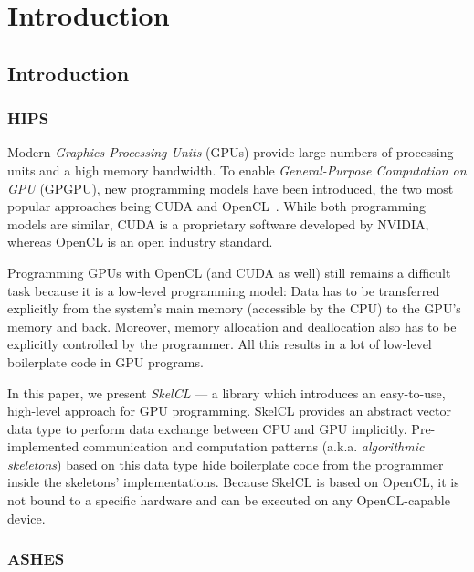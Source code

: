 
\chapter{Introduction} %

\label{ch:introduction} %

\section{Introduction}

\subsection{HIPS}
Modern \emph{Graphics Processing Units} (GPUs) provide large numbers of processing units and a high memory bandwidth.
To enable \emph{General-Purpose Computation on GPU} (GPGPU), new programming models have been introduced, the two most popular approaches being CUDA and OpenCL~\cite{KiHw-10,OpenCL-10}.
While both programming models are similar, CUDA is a proprietary software developed by NVIDIA, whereas OpenCL is an open industry standard.

Programming GPUs with OpenCL (and CUDA as well) still remains a difficult task because it is a low-level programming model:
Data has to be transferred explicitly from the system's main memory (accessible by the CPU) to the GPU's memory and back.
Moreover, memory allocation and deallocation also has to be explicitly controlled by the programmer.
All this results in a lot of low-level boilerplate code in GPU programs.

In this paper, we present \emph{SkelCL} --- a library which introduces an easy-to-use, high-level approach for GPU programming.
SkelCL provides an abstract vector data type to perform data exchange between CPU and GPU implicitly.
Pre-implemented communication and computation patterns (a.k.a. \emph{algorithmic skeletons}) based on this data type hide boilerplate code from the programmer inside the skeletons' implementations.
Because SkelCL is based on OpenCL, it is not bound to a specific hardware and can be executed on any OpenCL-capable device.

\subsection{ASHES}

